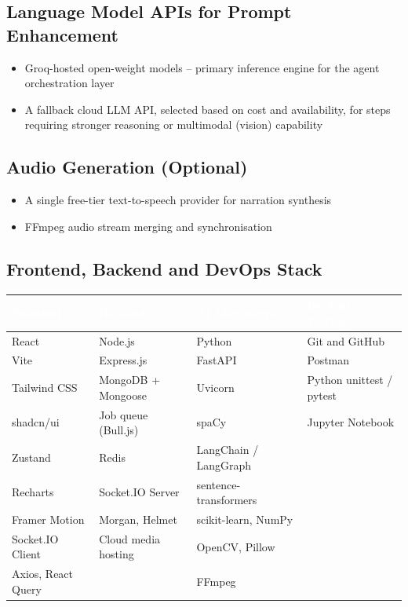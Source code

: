 \documentclass[11pt,a4paper]{article}
\newcommand{\tblhead}[1]{\cellcolor{headerblue}\textcolor{white}{\textbf{#1}}}
\begin{document}
\subsection{Language Model APIs for Prompt Enhancement}
\begin{itemize}[leftmargin=*]
\item Groq-hosted open-weight models -- primary inference engine for the agent orchestration layer
\item A fallback cloud LLM API, selected based on cost and availability, for steps requiring stronger reasoning or multimodal (vision) capability
\end{itemize}

\subsection{Audio Generation (Optional)}
\begin{itemize}[leftmargin=*]
\item A single free-tier text-to-speech provider for narration synthesis
\item FFmpeg audio stream merging and synchronisation
\end{itemize}

\subsection{Frontend, Backend and DevOps Stack}

\begin{center}
\begin{tabular}{|l|l|l|l|}
\hline
\tblhead{Frontend} & \tblhead{Backend} & \tblhead{AI Microservice} & \tblhead{DevOps / Testing} \\
\hline
React & Node.js & Python & Git and GitHub \\
Vite & Express.js & FastAPI & Postman \\
Tailwind CSS & MongoDB + Mongoose & Uvicorn & Python unittest / pytest \\
shadcn/ui & Job queue (Bull.js) & spaCy & Jupyter Notebook \\
Zustand & Redis & LangChain / LangGraph & \\
Recharts & Socket.IO Server & sentence-transformers & \\
Framer Motion & Morgan, Helmet & scikit-learn, NumPy & \\
Socket.IO Client & Cloud media hosting & OpenCV, Pillow & \\
Axios, React Query & & FFmpeg & \\
\hline
\end{tabular}
\end{center}
\end{document}

